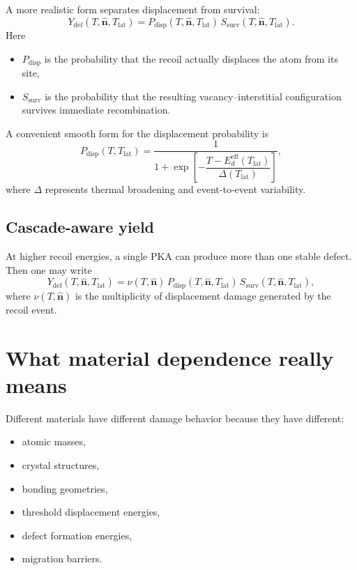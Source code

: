 \documentclass[11pt]{article}
\newcommand{\Tlat}{T_{\mathrm{lat}}}
\newcommand{\pdisp}{P_{\mathrm{disp}}}
\newcommand{\surv}{S_{\mathrm{surv}}}
\newcommand{\Ydef}{Y_{\mathrm{def}}}
\begin{document}
A more realistic form separates displacement from survival:
\begin{equation}
\Ydef(T,\hat{\mathbf n},\Tlat) = \pdisp(T,\hat{\mathbf n},\Tlat)\,\surv(T,\hat{\mathbf n},\Tlat).
\end{equation}
Here
\begin{itemize}
    \item $\pdisp$ is the probability that the recoil actually displaces the atom from its site,
    \item $\surv$ is the probability that the resulting vacancy--interstitial configuration survives immediate recombination.
\end{itemize}

A convenient smooth form for the displacement probability is
\begin{equation}
\pdisp(T,\Tlat)=\frac{1}{1+\exp\!\left[-\dfrac{T-E_{d}^{\mathrm{eff}}(\Tlat)}{\Delta(\Tlat)}\right]},
\end{equation}
where $\Delta$ represents thermal broadening and event-to-event variability.

\subsection{Cascade-aware yield}

At higher recoil energies, a single PKA can produce more than one stable defect. Then one may write
\begin{equation}
\Ydef(T,\hat{\mathbf n},\Tlat)=\nu(T,\hat{\mathbf n})\,\pdisp(T,\hat{\mathbf n},\Tlat)\,\surv(T,\hat{\mathbf n},\Tlat),
\end{equation}
where $\nu(T,\hat{\mathbf n})$ is the multiplicity of displacement damage generated by the recoil event.

\section{What material dependence really means}

Different materials have different damage behavior because they have different:
\begin{itemize}
    \item atomic masses,
    \item crystal structures,
    \item bonding geometries,
    \item threshold displacement energies,
    \item defect formation energies,
    \item migration barriers.
\end{itemize}
\end{document}
